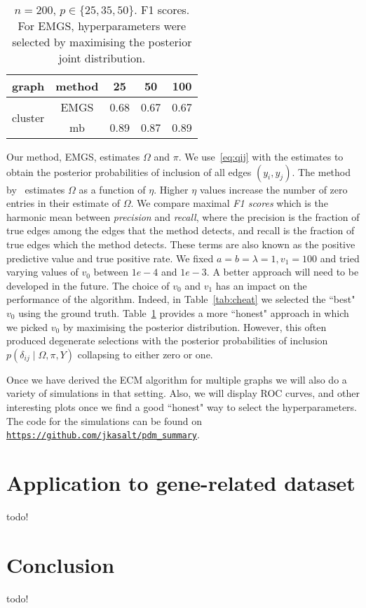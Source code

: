 \documentclass[a4paper, 11pt, oneside]{report}
\newcommand{\1}{\mathds{1}}
\begin{document}
\begin{table}
	\centering
	\small
	\caption{$n=200$, $p \in \{25, 35, 50\}$. F1 scores. For EMGS, hyperparameters were selected by maximising the posterior joint distribution.}\label{tab:honest}
	\begin{tabular}{|l||c|c|c|c|}
		\hline
		graph                    & method & 25   & 50   & 100  \\
		\hline
		\multirow{2}{*}{cluster} & EMGS   & 0.68 & 0.67 & 0.67 \\
		                         & mb     & 0.89 & 0.87 & 0.89 \\
		\hline
	\end{tabular}
\end{table}
Our method, EMGS, estimates $\Omega$ and $\pi$. We use~\eqref{eq:qij} with the estimates to obtain the posterior probabilities of inclusion of all edges $(y_i, y_j)$. The method by~\cite{mein2006} estimates $\Omega$ as a function of $\eta.$ Higher $\eta$ values increase the number of zero entries in their estimate of $\Omega.$
We compare maximal \emph{F1 scores} which is the harmonic mean between \emph{precision}
and \emph{recall}, where the precision is the fraction of true edges
among the edges that the method detects, and recall is the fraction
of true edges which the method detects. These terms are also known as the
positive predictive value and true positive rate.
We fixed $a = b = \lambda = 1, v_1 = 100$ and tried varying
values of $v_0$ between $1e-4$ and $1e-3$.
A better approach will need to be developed in the future.
The choice of $v_0$ and $v_1$ has an impact on the performance of the algorithm.
Indeed, in Table~\ref{tab:cheat} we selected the ``best" $v_0$ using the ground truth.
Table~\ref{tab:honest} provides a more ``honest" approach in which we picked $v_0$ by
maximising the posterior distribution.
However, this often produced degenerate selections with the posterior probabilities of inclusion $p(\delta_{ij} \mid \Omega, \pi, Y)$ collapsing to either zero or one.

Once we have derived the ECM algorithm for multiple graphs we will also do a variety of simulations in that setting.
Also, we will display ROC curves, and other interesting plots once we find a good ``honest" way to select the hyperparameters.
The code for the simulations can be found on \href{https://github.com/jkasalt/pdm_summary}{\texttt{https://github.com/jkasalt/pdm\_summary}}.

\chapter{Application to gene-related dataset}
todo!

\chapter{Conclusion}
todo!
\cleardoublepage
{}
{}
\printbibliography
\end{document}

